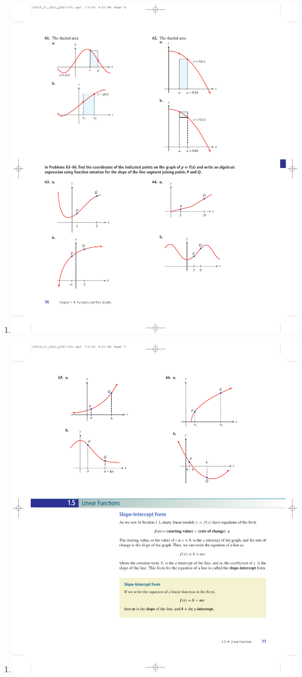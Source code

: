\documentclass[10pt,]{book}
\theoremstyle{plain}
\theoremstyle{definition}
\theoremstyle{definition}
\theoremstyle{definition}
\theoremstyle{definition}
\numberwithin{equation}{part}
\begin{document}
\begin{exercisegroup}
\begin{multicols}{2}
\begin{enumerate}[label=*\alph**]
\item\hypertarget{li-1095}{}\includegraphics[width=0.8\linewidth]{images/fig-ex-1-4-64b}
%
\end{enumerate}
\end{multicols}
%
\exercise[65.]\hypertarget{exercise-280}{}\leavevmode%
\begin{multicols}{2}
\begin{enumerate}[label=*\alph**]
\item\hypertarget{li-1096}{}\includegraphics[width=0.8\linewidth]{images/fig-ex-1-4-65a}

\end{enumerate}
\end{multicols}
\end{exercisegroup}
\end{document}
